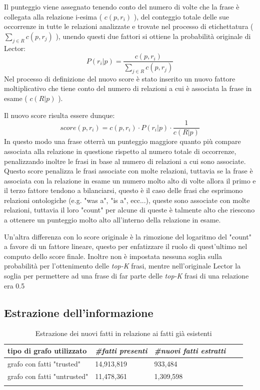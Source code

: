 \documentclass[10pt,a4paper,twocolumn]{article}
\begin{document}
Il punteggio viene assegnato tenendo conto del numero di volte che la frase è collegata alla relazione i-esima ( $c(p,r_i)$ ), del conteggio totale delle sue occorrenze in tutte le relazioni analizzate e trovate nel processo di etichettatura ( $\sum_{j \in R} c(p,r_j)$ ), unendo questi due fattori si ottiene la probabilità originale di Lector:
\[P(r_i|p) = \frac{c(p,r_i)}{\sum_{j \in R}c(p,r_j)}\]
Nel processo di definizione del nuovo score è stato inserito un nuovo fattore moltiplicativo che tiene conto del numero di relazioni a cui è associata la frase in esame ( $c(R|p)$ ).

Il nuovo score risulta essere dunque:
\[score(p,r_i)=c(p,r_i)\cdot P(r_i|p)\cdot \frac{1}{c(R|p)} \]
In questo modo una frase otterrà un punteggio maggiore quanto più compare associata alla relazione in questione rispetto al numero totale di occorrenze, penalizzando inoltre le frasi in base al numero di relazioni a cui sono associate. Questo score penalizza le frasi associate con molte relazioni, tuttavia se la frase è associata con la relazione in esame un numero molto alto di volte allora il primo e il terzo fattore tendono a bilanciarsi, questo è il caso delle frasi che esprimono relazioni ontologiche (e.g. "was a", "is a", ecc...), queste sono associate con molte relazioni, tuttavia il loro "count" per alcune di queste è talmente alto che riescono a ottenere un punteggio molto alto all'interno della relazione in esame.

Un'altra differenza con lo score originale è la rimozione del logaritmo del "count" a favore di un fattore lineare, questo per enfatizzare il ruolo di quest'ultimo nel computo dello score finale. Inoltre non è impostata nessuna soglia sulla probabilità per l'ottenimento delle \textit{top-K} frasi, mentre nell'originale Lector la soglia per permettere ad una frase di far parte delle \textit{top-K} frasi di una relazione era 0.5

\subsection{Estrazione dell'informazione}

\begin{table}[t]
	\centering
	\label{nuovi-vecchi}
	\begin{tabular}{lllll}
		tipo di grafo utilizzato    & \textit{\#fatti presenti} & \textit{\#nuovi fatti estratti} &  &  \\
		\hline
		grafo con fatti "trusted"   & 14,913,819                & 933,484                         &  &  \\
		grafo con fatti "untrusted" & 11,478,361                & 1,309,598                       &  &  \\
		&                           &                                 &  & 
	\end{tabular}
		\caption{Estrazione dei nuovi fatti in relazione ai fatti già esistenti}
\end{table}
\end{document}
